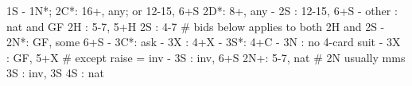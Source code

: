 1S - 1N*; 2C*: 16+, any; or 12-15, 6+S
2D*: 8+, any
   - 2S : 12-15, 6+S
   - other : nat and GF
2H : 5-7, 5+H
2S : 4-7
# bids below applies to both 2H and 2S
   - 2N*: GF, some 6+S
        - 3C*: ask
             - 3X : 4+X
             - 3S*: 4+C
             - 3N : no 4-card suit
   - 3X : GF, 5+X  # except raise = inv
   - 3S : inv, 6+S
2N+: 5-7, nat  # 2N usually mms
3S : inv, 3S
4S : nat